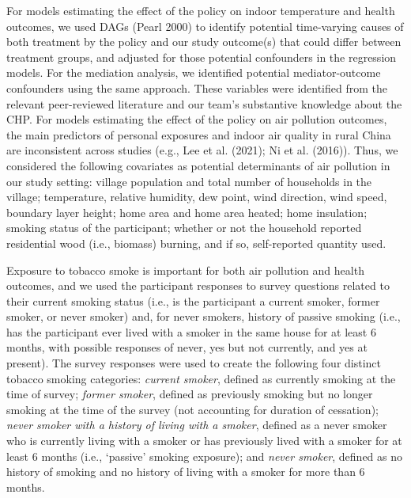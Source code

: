 \documentclass[
  letterpaper,
  DIV=11,
  numbers=noendperiod]{scrartcl}
\begin{document}
For models estimating the effect of the policy on indoor temperature and
health outcomes, we used DAGs (Pearl 2000) to identify potential
time-varying causes of both treatment by the policy and our study
outcome(s) that could differ between treatment groups, and adjusted for
those potential confounders in the regression models. For the mediation
analysis, we identified potential mediator-outcome confounders using the
same approach. These variables were identified from the relevant
peer-reviewed literature and our team's substantive knowledge about the
CHP. For models estimating the effect of the policy on air pollution
outcomes, the main predictors of personal exposures and indoor air
quality in rural China are inconsistent across studies (e.g., Lee et al.
(2021); Ni et al. (2016)). Thus, we considered the following covariates
as potential determinants of air pollution in our study setting: village
population and total number of households in the village; temperature,
relative humidity, dew point, wind direction, wind speed, boundary layer
height; home area and home area heated; home insulation; smoking status
of the participant; whether or not the household
reported residential wood (i.e., biomass) burning, and if so,
self-reported quantity used.

Exposure to tobacco smoke is important for both air pollution and health
outcomes, and we used the participant responses to survey questions
related to their current smoking status (i.e., is the participant a
current smoker, former smoker, or never smoker) and, for never smokers,
history of passive smoking (i.e., has the participant ever lived with a
smoker in the same house for at least 6 months, with possible responses
of never, yes but not currently, and yes at present). The survey
responses were used to create the following four distinct tobacco
smoking categories: \emph{current smoker}, defined as currently smoking
at the time of survey; \emph{former smoker}, defined as previously
smoking but no longer smoking at the time of the survey (not accounting
for duration of cessation); \emph{never smoker with a history of living
with a smoker}, defined as a never smoker who is currently living with a
smoker or has previously lived with a smoker for at least 6 months
(i.e., `passive' smoking exposure); and \emph{never smoker}, defined as
no history of smoking and no history of living with a smoker for more
than 6 months.
\end{document}
